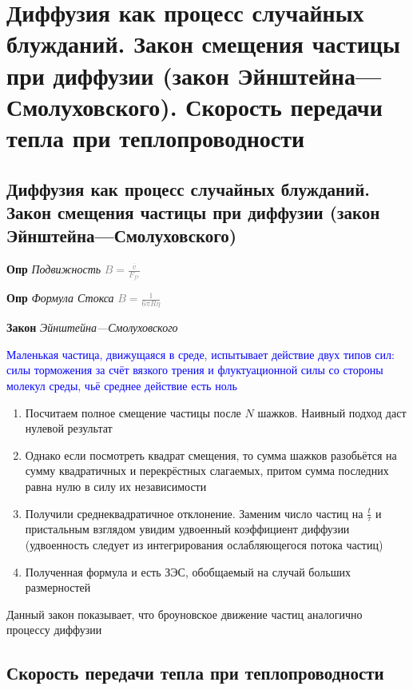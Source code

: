 \documentclass[a4paper, 14pt]{article}
\begin{document}
    \section{Диффузия как процесс случайных блужданий. Закон смещения частицы при диффузии (закон
    Эйнштейна—Смолуховского).
    Скорость передачи тепла при теплопроводности}

    \subsection{Диффузия как процесс случайных блужданий. Закон смещения частицы при диффузии (закон
    Эйнштейна—Смолуховского)}

    \textbf{Опр} \textit{Подвижность} \textcolor{gray}{$B = \frac{\overline{v}}{F_{fr}}$}

    \textbf{Опр} \textit{Формула Стокса} \textcolor{gray}{$B = \frac{1}{6 \pi R \eta}$}

    \textbf{Закон} \textit{Эйнштейна—Смолуховского}

    \textcolor{blue}{Маленькая частица, движущаяся в среде, испытывает действие двух типов сил: силы торможения за
    счёт вязкого трения и флуктуационной силы со стороны молекул среды, чьё среднее действие есть ноль}

    \begin{enumerate}
        \item Посчитаем полное смещение частицы после $N$ шажков.
        Наивный подход даст нулевой результат
        \item Однако если посмотреть квадрат смещения, то сумма шажков разобьётся на сумму квадратичных и
        перекрёстных слагаемых, притом сумма последних равна нулю в силу их независимости
        \item Получили среднеквадратичное отклонение.
        Заменим число частиц на $\frac{t}{\tau}$ и пристальным взглядом увидим удвоенный коэффициент диффузии
        (удвоенность следует из интегрирования ослабляющегося потока частиц)
        \item Полученная формула и есть ЗЭС, обобщаемый на случай больших размерностей
    \end{enumerate}

    Данный закон показывает, что броуновское движение частиц аналогично процессу диффузии

    \subsection{Скорость передачи тепла при теплопроводности}
\end{document}
